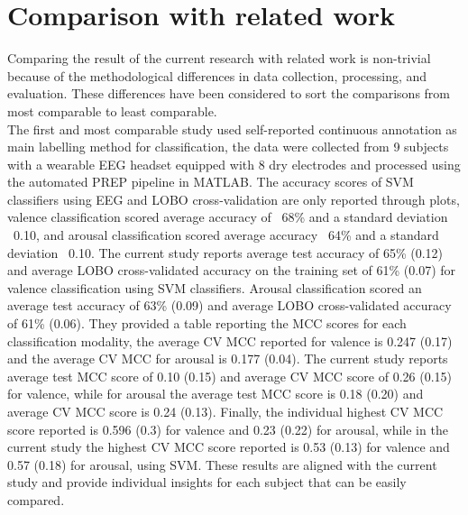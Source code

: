 \section{Comparison with related work}
\label{sec:comparison}
Comparing the result of the current research with related work is non-trivial because of the methodological differences in data collection, processing, and evaluation. These differences have been considered to sort the comparisons from most comparable to least comparable. 
\\
The first and most comparable study \cite{thammasan_multimodal_2017} used self-reported continuous annotation as main labelling method for classification, the data were collected from 9 subjects with a wearable EEG headset equipped with 8 dry electrodes and processed using the automated PREP pipeline in MATLAB. The accuracy scores of SVM classifiers using EEG and LOBO cross-validation are only reported through plots, valence classification scored average accuracy of ~68\% and a standard deviation ~0.10, and arousal classification scored average accuracy ~64\% and a standard deviation ~0.10. The current study reports average test accuracy of 65\% (0.12) and average LOBO cross-validated accuracy on the training set of 61\% (0.07) for valence classification using SVM classifiers. Arousal classification scored an average test accuracy of 63\% (0.09) and average LOBO cross-validated accuracy of 61\% (0.06). They provided a table reporting the MCC scores for each classification modality, the average CV MCC reported for valence is 0.247 (0.17) and the average CV MCC for arousal is 0.177 (0.04). The current study reports average test MCC score of 0.10 (0.15) and average CV MCC score of 0.26 (0.15) for valence, while for arousal the average test MCC score is 0.18 (0.20) and average CV MCC score is 0.24 (0.13). Finally, the individual highest CV MCC score reported is 0.596 (0.3) for valence and 0.23 (0.22) for arousal, while in the current study the highest CV MCC score reported is 0.53 (0.13) for valence and 0.57 (0.18) for arousal, using SVM. These results are aligned with the current study and provide individual insights for each subject that can be easily compared.
\\
